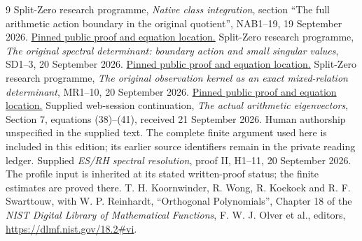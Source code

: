 \documentclass[11pt]{article}
\begin{document}
\begin{thebibliography}{9}
 Split-Zero research programme,
\emph{Native class integration}, section ``The full arithmetic action
boundary in the original quotient'', NAB1--19, 19 September 2026.
\href{https://github.com/KokunoYumeto/zeta-function-research-reader/blob/5992ad50c0f2a06921f1fcaded7b4e38097c0739/workbenches/splitzero-tandem/continuations/20260920-original-kernel-mixed-determinants/providers/09_INPUT_CUMULATIVE_PROOFS.tex#L109189}{Pinned public proof and equation location.}
 Split-Zero research programme,
\emph{The original spectral determinant: boundary action and small
singular values}, SD1--3, 20 September 2026.
\href{https://github.com/KokunoYumeto/zeta-function-research-reader/blob/5992ad50c0f2a06921f1fcaded7b4e38097c0739/workbenches/splitzero-tandem/continuations/20260920-original-kernel-mixed-determinants/providers/ORIGINAL_SPECTRAL_DETERMINANT.tex#L34}{Pinned public proof and equation location.}
 Split-Zero research programme,
\emph{The original observation kernel as an exact mixed-relation
determinant}, MR1--10, 20 September 2026.
\href{https://github.com/KokunoYumeto/zeta-function-research-reader/blob/5992ad50c0f2a06921f1fcaded7b4e38097c0739/workbenches/splitzero-tandem/continuations/20260920-original-kernel-mixed-determinants/ORIGINAL_KERNEL_MIXED_DETERMINANT.tex#L36}{Pinned public proof and equation location.}
 Supplied web-session continuation,
\emph{The actual arithmetic eigenvectors}, Section 7, equations (38)--(41),
received 21 September 2026. Human authorship unspecified in the supplied
text. The complete finite argument used here is included in this edition; its earlier source identifiers remain in the private reading ledger.
 Supplied \emph{ES/RH spectral resolution}, proof II,
H1--11, 20 September 2026. The profile input is inherited at its
stated written-proof status; the finite estimates are proved there.
 T. H. Koornwinder, R. Wong, R. Koekoek and R. F. Swarttouw, with W. P. Reinhardt,
``Orthogonal Polynomials'', Chapter 18 of the \emph{NIST Digital Library
of Mathematical Functions}, F. W. J. Olver et al., editors,
\url{https://dlmf.nist.gov/18.2#vi}.
\end{thebibliography}
\end{document}
